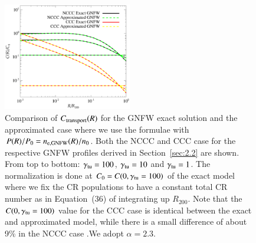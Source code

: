\documentclass[traditabstract]{aa}
\begin{document}
\begin{appendix}
\begin{figure}[t]
\centering
\includegraphics[width=0.5\textwidth]{figures/CR_profiles_REXexactVSfake.eps}
\caption{Comparison of $C_{\rm{transport}}(R)$ for the GNFW exact solution and the approximated case where we use the \cite{2011A&A...527A..99E} formulae with $P(R)/P_{0}=n_{\rm{e,GNFW}}(R)/n_{0}$. Both the NCCC and CCC case for the respective GNFW profiles derived in Section~\ref{sec:2.2} are shown. From top to bottom: $\gamma_{\rm{tu}}=100$, $\gamma_{\rm{tu}}=10$ and $\gamma_{\rm{tu}}=1$. The normalization is done at $C_{0}=C(0,\gamma_{\rm{tu}}=100)$ of the exact model where we fix the CR populations to have a constant total CR number as in Equation~(36) of \cite{2011A&A...527A..99E} integrating up $R_{200}$. Note that the $C(0,\gamma_{\rm{tu}}=100)$ value for the CCC case is identical between the exact and approximated model, while there is a small difference of about 9\% in the NCCC case .We adopt $\alpha=2.3$.}
\label{fig:REXexactVSfake}
\end{figure}

\end{appendix}
\end{document}
